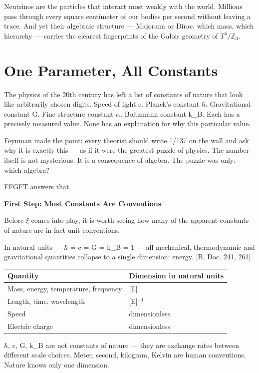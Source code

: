 \documentclass[11pt,oneside]{book}
\begin{document}
Neutrinos are the particles that interact most weakly with the world.
Millions pass through every square centimeter of our bodies per second
without leaving a trace. And yet their algebraic structure — Majorana or
Dirac, which mass, which hierarchy — carries the clearest fingerprints of
the Galois geometry of $T^4/\mathbb{Z}_3$.


\chapter{One Parameter, All Constants}

The physics of the 20th century has left a list of constants of nature that
look like arbitrarily chosen digits. Speed of light c. Planck's constant
$\hbar$. Gravitational constant G. Fine-structure constant $\alpha$. Boltzmann
constant k\_B. Each has a precisely measured value. None has an explanation
for why this particular value.

Feynman made the point: every theorist should write 1/137 on the wall and
ask why it is exactly this --- as if it were the greatest puzzle of physics.
The number itself is not mysterious. It is a consequence of algebra.
The puzzle was only: which algebra?

FFGFT answers that.

\textbf{First Step: Most Constants Are Conventions}

Before $\xi$ comes into play, it is worth seeing how many of the apparent
constants of nature are in fact unit conventions.

In natural units — $\hbar$ = c = G = k\_B = 1 — all mechanical,
thermodynamic and gravitational quantities collapse to a single dimension:
energy. [B, Doc. 241, 261]

\begin{center}
\small
\begin{tabular}{ll}
\toprule
Quantity & Dimension in natural units \\
\midrule
Mass, energy, temperature, frequency & [E] \\
Length, time, wavelength & [E]$^{-1}$ \\
Speed & dimensionless \\
Electric charge & dimensionless \\
\bottomrule
\end{tabular}
\end{center}

$\hbar$, c, G, k\_B are not constants of nature — they are exchange rates
between different scale choices. Meter, second, kilogram, Kelvin are human
conventions. Nature knows only one dimension.
\end{document}
